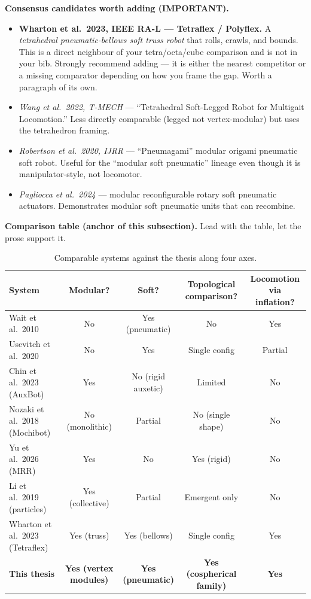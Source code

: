\textbf{Consensus candidates worth adding (IMPORTANT).}
\begin{itemize}
    \item \textbf{Wharton et al.\ 2023, IEEE RA-L --- Tetraflex /
          Polyflex.} A \emph{tetrahedral pneumatic-bellows soft truss
          robot} that rolls, crawls, and bounds. This is a direct
          neighbour of your tetra/octa/cube comparison and is not in
          your bib. Strongly recommend adding --- it is either the
          nearest competitor or a missing comparator depending on
          how you frame the gap. Worth a paragraph of its own.
    \item \emph{Wang et al.\ 2022, T-MECH} --- ``Tetrahedral
          Soft-Legged Robot for Multigait Locomotion.'' Less directly
          comparable (legged not vertex-modular) but uses the
          tetrahedron framing.
    \item \emph{Robertson et al.\ 2020, IJRR} --- ``Pneumagami''
          modular origami pneumatic soft robot. Useful for the
          ``modular soft pneumatic'' lineage even though it is
          manipulator-style, not locomotor.
    \item \emph{Pagliocca et al.\ 2024} --- modular reconfigurable
          rotary soft pneumatic actuators. Demonstrates modular
          soft pneumatic units that can recombine.
\end{itemize}

\textbf{Comparison table (anchor of this subsection).} Lead with the
table, let the prose support it.

\begin{table}[h]
\centering
\small
\begin{tabular}{lcccc}
\toprule
System & Modular? & Soft? & Topological comparison? & Locomotion via inflation? \\
\midrule
Wait et al.\ 2010 & No & Yes (pneumatic) & No & Yes \\
Usevitch et al.\ 2020 & No & Yes & Single config & Partial \\
Chin et al.\ 2023 (AuxBot) & Yes & No (rigid auxetic) & Limited & No \\
Nozaki et al.\ 2018 (Mochibot) & No (monolithic) & Partial & No (single shape) & No \\
Yu et al.\ 2026 (MRR) & Yes & No & Yes (rigid) & No \\
Li et al.\ 2019 (particles) & Yes (collective) & Partial & Emergent only & No \\
Wharton et al.\ 2023 (Tetraflex) & Yes (truss) & Yes (bellows) & Single config & Yes \\
\textbf{This thesis} & \textbf{Yes (vertex modules)} & \textbf{Yes (pneumatic)} & \textbf{Yes (cospherical family)} & \textbf{Yes} \\
\bottomrule
\end{tabular}
\caption{Comparable systems against the thesis along four axes.}
\label{tab:comparison}
\end{table}

